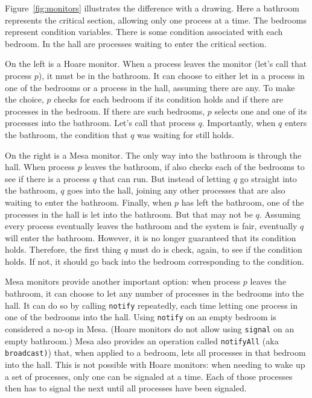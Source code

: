 \documentclass{report}
\begin{document}
Figure~\ref{fig:monitors} illustrates the difference with a drawing.
Here a bathroom represents the critical section, allowing only one
process at a time.  The bedrooms represent condition variables.
There is some condition associated with each bedroom.
In the hall are processes waiting to enter the critical section.

On the left is a Hoare monitor.  When a process leaves the monitor
(let's call that process $p$), it must be in the bathroom.
It can choose to either let in a process
in one of the bedrooms or a process in the hall, assuming there are any.
To make the choice, $p$ checks for each bedroom if its condition holds
and if there are processes in the bedroom.
If there are such bedrooms, $p$ selects one and one of its processes into
the bathroom.  Let's call that process $q$.  Importantly, when $q$ enters
the bathroom, the condition that $q$ was waiting for still holds.

On the right is a Mesa monitor.  The only way into the bathroom is through
the hall.  When process $p$ leaves the bathroom,
if also checks each of the bedrooms to see if there is a process $q$ that
can run.  But instead of letting $q$ go straight into the bathroom, $q$
goes into the hall, joining any other processes that are also waiting to
enter the bathroom.  Finally, when $p$ has left the bathroom, one of the
processes in the hall is let into the bathroom.  But that may not be $q$.
Assuming every process eventually leaves the bathroom and the system is
fair, eventually $q$ will enter the bathroom.  However, it is no longer
guaranteed that its condition holds.  Therefore, the first thing $q$ must
do is check, again, to see if the condition holds.  If not, it should go back
into the bedroom corresponding to the condition.

Mesa monitors provide another important option:
when process $p$ leaves the bathroom, it can choose to let any number of
processes in the bedrooms into the hall.  It can do so by calling
\texttt{notify} repeatedly, each time letting one process in one of the
bedrooms into the hall.  Using \texttt{notify} on an empty
bedroom is considered a no-op in Mesa.  (Hoare monitors do not allow
using \texttt{signal} on an empty bathroom.) Mesa also provides an
operation called \texttt{notifyAll}
(aka \texttt{broadcast)})
that, when applied to
a bedroom, lets all processes in that bedroom into the hall.
This is not possible with Hoare monitors: when needing to wake up a set
of processes, only one can be signaled at a time.  Each of those processes
then has to signal the next until all processes have been signaled.
\end{document}
